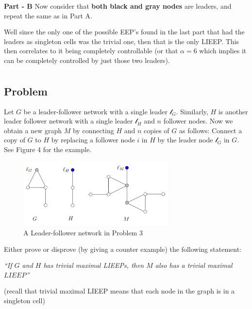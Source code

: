 \documentclass[]{article}
\numberwithin{equation}{section}
\begin{document}
\textbf{Part - B} 
Now consider that \textbf{both black and gray nodes} are leaders, and repeat the same as in Part A.

Well since the only one of the possible EEP's found in the last part that had the leaders as singleton cells was the trivial one, then that is the only LIEEP.
This then correlates to it being completely controllable (or that $\alpha = 6$ which implies it can be completely controlled by just those two leaders).





\newpage
\section{}
\subsection*{Problem}
Let $G$ be a leader-follower network with a single leader $\mathcal{l}_G$. 
Similarly, $H$ is another leader follower network with a single leader $\mathcal{l}_H$ and $n$ follower nodes. 
Now we obtain a new graph $M$ by connecting $H$ and $n$ copies of $G$ as follows: 
Connect a copy of $G$ to $H$ by replacing a follower node $i$ in $H$ by the leader node $\mathcal{l}_G$ in $G$. 
See Figure 4 for the example.

\begin{figure}[h]
    \centering
    \includegraphics[width = 0.7\textwidth]{figs/image4.png}
    \caption{A Leader-follower network in Problem 3}
\end{figure} 

Either prove or disprove (by giving a counter example) the following statement: 

\emph{``If $G$ and $H$ has trivial maximal LIEEPs, then $M$ also has a trivial maximal $LIEEP$''}

(recall that trivial maximal LIEEP means that each node in the graph is in a singleton cell)
\end{document}
